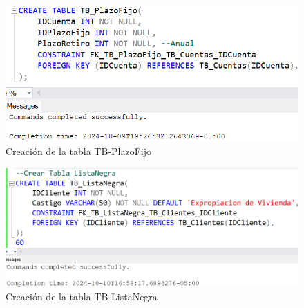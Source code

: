 \begin{figure}[H]
  \centering
  \includegraphics[scale = 0.6]{Imagenes/SQL/2.Crear_tablas/crear_tb_plazofijo.png}
  \caption{Creación de la tabla TB-PlazoFijo}
\end{figure}

\begin{figure}[H]
  \centering
  \includegraphics[scale = 0.5]{Imagenes/SQL/2.Crear_tablas/crear_tb_listanegra.png}
  \caption{Creación de la tabla TB-ListaNegra}
\end{figure}